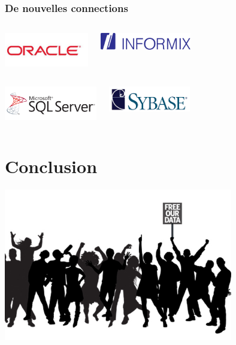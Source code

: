\documentclass{beamer}
\begin{document}
\begin{frame}
  \frametitle{De nouvelles connections}

  \begin{columns}[c]
    \begin{center}
      \includegraphics[height=4em]{oracle-logo.png}
    \end{center}
    \begin{center}
      \includegraphics[height=2em]{Informix_d1323_450x450.png}
    \end{center}
  \end{columns}
  \vfill

  \begin{columns}[c]
    \begin{center}
      \includegraphics[height=4em]{mssql.png}
    \end{center}
    \begin{center}
      \includegraphics[height=3em]{sybase_logo.png}
    \end{center}
  \end{columns}
\end{frame}

\section{Conclusion}

\begin{frame}[fragile]
  \begin{center}
    \includegraphics[height=18em]{free-our-open-data.jpg}
  \end{center}
\end{frame}
\end{document}

